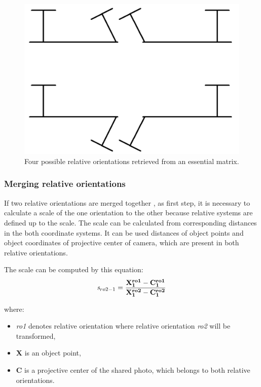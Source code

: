 \documentclass[a4paper,12pt]{article}
\newcommand{\evect}[1]{
{\bf #1}
}
\newcommand{\escal}[1]{
{\it #1}
}
\newcommand{\term}[1]{
{\it #1}%
}
\begin{document}
\begin{figure}[h]
    \centering
    \includegraphics[scale=0.12]{figures/eo_ambiguity.png}
    \caption{Four possible relative orientations retrieved from an essential matrix.}
    \label{fig:rel_or_amb}
\end{figure}


\subsubsection{Merging relative orientations}
\label{sec:ess_chain}


If two relative orientations are merged together \cite{pietzsch2001robot}, as first step, it is necessary to calculate a scale of the one orientation
to the other because relative systems are defined up to the scale.
The scale can be calculated from corresponding distances in the both coordinate systems. 
It can be used distances of 
object points and object coordinates of projective center of camera, which are present in both relative orientations.


The scale can be computed by this equation:
\begin{equation}
\escal{s}_{ro2-1} = \frac{\mathbf{\evect{X}^{ro1}_{1} - \evect{C^{ro1}_{1}}}}
	                {\mathbf{\evect{X}^{ro2}_{1} - \evect{C^{ro2}_{1}}}}
\end{equation}

where:
\begin{itemize}
\item \term{ro1} denotes relative orientation where relative  orientation \term{ro2} will be transformed,
\item \evect{X} is an object point,
\item \evect{C} is a projective center of the shared photo, which belongs to both relative orientations.
\end{itemize}
\end{document}
